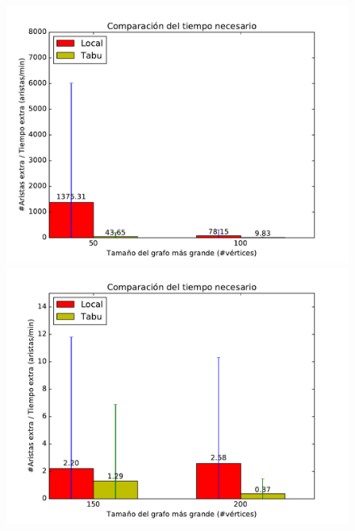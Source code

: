\begin{figure}[H]
\centering
\begin{minipage}{0.49\textwidth}
  \centering
    \includegraphics[width=1\textwidth]{graficos/problema_7/cociente0.pdf}
  \caption{}
  \label{fig:7-cociente1}
\end{minipage}%
\hspace{0.01\textwidth}
\begin{minipage}{0.49\textwidth}   
  \centering
    \includegraphics[width=1\textwidth]{graficos/problema_7/cociente2.pdf} 
  \caption{}
  \label{fig:7-cociente2}
\end{minipage}


\end{figure}
